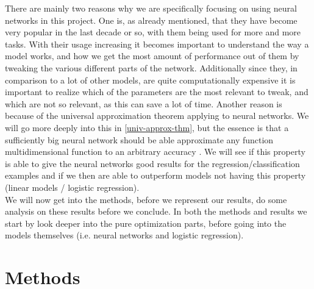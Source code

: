 \documentclass{article}
\begin{document}
There are mainly two reasons why we are specifically focusing on using neural
networks in this project. One is, as already mentioned, that they have become
very popular in the last decade or so, with them being used for more and more
tasks. With their usage increasing it becomes important to understand the way a
model works, and how we get the most amount of performance out of them by
tweaking the various different parts of the network. Additionally since they, in
comparison to a lot of other models, are quite computationally expensive it is
important to realize which of the parameters are the most relevant to tweak, and
which are not so relevant, as this can save a lot of time. Another reason is
because of the universal approximation theorem applying to neural networks. We
will go more deeply into this in \ref{univ-approx-thm}, but the essence is that
a sufficiently big neural network should be able approximate any function
multidimensional function to an arbitrary accuracy
\cite[s.~13.5]{lecutenotes13}. We will see if this property is able to give the
neural networks good results for the regression/classification examples and if
we then are able to outperform models not having this property (linear models /
logistic regression).
\\

We will now get into the methods, before we represent our results, do some
analysis on these results before we conclude. In both the methods and results we
start by look deeper into the pure optimization parts, before going into the
models themselves (i.e. neural networks and logistic regression).

\section{Methods}
\end{document}
